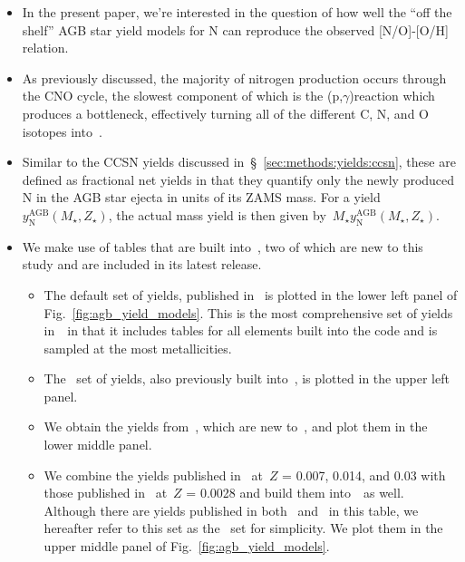 \documentclass[ms.tex]{subfiles}
\begin{document}
\begin{itemize} 
	\item In the present paper, we're interested in the question of how 
	well the ``off the shelf'' AGB star yield models for N can reproduce the 
	observed [N/O]-[O/H] relation. 

	\item As previously discussed, the majority of nitrogen production occurs 
	through the CNO cycle, the slowest component of which is the 
	\Nfourteen(p,$\gamma$)\Ofifteen reaction which produces a bottleneck, 
	effectively turning all of the different C, N, and O isotopes 
	into~\Nfourteen. 

	\item Similar to the CCSN yields discussed 
	in~\S~\ref{sec:methods:yields:ccsn}, these are defined as fractional net 
	yields in that they quantify only the newly produced N in the AGB star 
	ejecta in units of its ZAMS mass. 
	For a yield~$y_\text{N}^\text{AGB}(M_\star, Z_\star)$, the actual mass 
	yield is then given by~$M_\star y_\text{N}^\text{AGB}(M_\star, Z_\star)$. 

	\item We make use of tables that are built into~\vice, two of which are new 
	to this study and are included in its latest release. 
	\begin{itemize} 
		\item The default set of yields, published in~\citet{Cristallo2011, 
		Cristallo2015} is plotted in the lower left panel of 
		Fig.~\ref{fig:agb_yield_models}. 
		This is the most comprehensive set of yields in~\vice~in that it 
		includes tables for all elements built into the code and is sampled at 
		the most metallicities. 

		\item The~\citet{Karakas2010} set of yields, also previously built 
		into~\vice, is plotted in the upper left panel. 

		\item We obtain the yields from~\citet{Ventura2013}, which are new 
		to~\vice, and plot them in the lower middle panel. 

		\item We combine the yields published in~\citet{Karakas2016} at~$Z$ = 
		0.007, 0.014, and 0.03 with those published in~\citet{Karakas2018} 
		at~$Z$ = 0.0028 and build them into~\vice~as well. 
		Although there are yields published in both~\citet{Karakas2016} 
		and~\citet{Karakas2018} in this table, we hereafter refer to this set 
		as the~\citet{Karakas2016} set for simplicity. 
		We plot them in the upper middle panel of 
		Fig.~\ref{fig:agb_yield_models}. 
	\end{itemize} 


\end{itemize}
\end{document}
